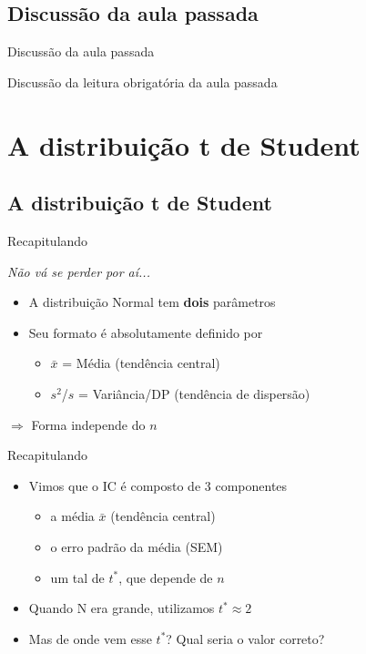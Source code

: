 \documentclass{beamer}
\begin{document}
\subsection{Discussão da aula passada}

\begin{frame}{Discussão da aula passada}
  \begin{block}{}
    Discussão da leitura obrigatória da aula passada
  \end{block}
\end{frame}

\section[t de Student]{A distribuição t de Student}

\subsection{A distribuição t de Student}

\begin{frame}{Recapitulando}
  \begin{block}{\em Não vá se perder por aí...}
    \begin{itemize}
    \item A distribuição Normal tem {\bf dois} parâmetros
    \item Seu formato é absolutamente definido por
      \begin{itemize}
      \item $\bar{x}$ = Média {\tiny (tendência central)}
      \item $s^2$/$s$ = Variância/DP {\tiny (tendência de dispersão)}
      \end{itemize}
    \end{itemize}

    \begin{center}
      $\Rightarrow$ Forma independe do $n$
    \end{center}
  \end{block}
\end{frame}

\begin{frame}{Recapitulando}
  \begin{itemize}
  \item Vimos que o IC é composto de 3 componentes
    \begin{itemize}
    \item a média $\bar{x}$ (tendência central)
    \item o erro padrão da média (SEM)
    \item um tal de $t^{*}$, que depende de $n$
    \end{itemize}
  \item Quando N era grande, utilizamos $t^{*} \approx 2$
    \bigskip
  \item Mas de onde vem esse $t^{*}$? Qual seria o valor correto?
  \end{itemize}
\end{frame}
\end{document}
